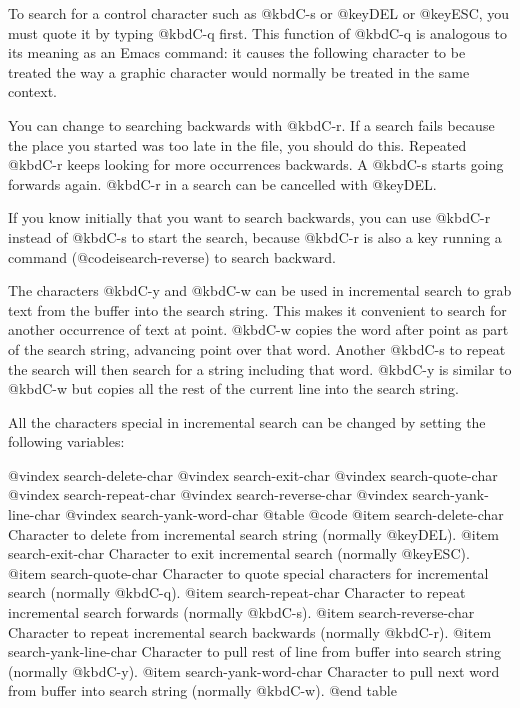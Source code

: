 {{{{{{{  To search for a control character such as @kbd{C-s} or @key{DEL} or @key{ESC},
you must quote it by typing @kbd{C-q} first.  This function of @kbd{C-q} is
analogous to its meaning as an Emacs command: it causes the following
character to be treated the way a graphic character would normally be
treated in the same context.

  You can change to searching backwards with @kbd{C-r}.  If a search fails
because the place you started was too late in the file, you should do this.
Repeated @kbd{C-r} keeps looking for more occurrences backwards.  A
@kbd{C-s} starts going forwards again.  @kbd{C-r} in a search can be cancelled
with @key{DEL}.

  If you know initially that you want to search backwards, you can
use @kbd{C-r} instead of @kbd{C-s} to start the search, because @kbd{C-r}
is also a key running a command (@code{isearch-reverse}) to search
backward.

  The characters @kbd{C-y} and @kbd{C-w} can be used in incremental search
to grab text from the buffer into the search string.  This makes it
convenient to search for another occurrence of text at point.  @kbd{C-w}
copies the word after point as part of the search string, advancing
point over that word.  Another @kbd{C-s} to repeat the search will then
search for a string including that word.  @kbd{C-y} is similar to @kbd{C-w}
but copies all the rest of the current line into the search string.

  All the characters special in incremental search can be changed by setting
the following variables:

@vindex search-delete-char
@vindex search-exit-char
@vindex search-quote-char
@vindex search-repeat-char
@vindex search-reverse-char
@vindex search-yank-line-char
@vindex search-yank-word-char
@table @code
@item search-delete-char
Character to delete from incremental search string (normally @key{DEL}).
@item search-exit-char
Character to exit incremental search (normally @key{ESC}).
@item search-quote-char
Character to quote special characters for incremental search (normally
@kbd{C-q}).
@item search-repeat-char
Character to repeat incremental search forwards (normally @kbd{C-s}).
@item search-reverse-char
Character to repeat incremental search backwards (normally @kbd{C-r}).
@item search-yank-line-char
Character to pull rest of line from buffer into search string
(normally @kbd{C-y}).
@item search-yank-word-char
Character to pull next word from buffer into search string (normally
@kbd{C-w}).
@end table

}}}}}}}
